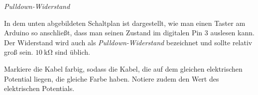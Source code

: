 \begin{aufgabe}\emph{Pulldown-Widerstand}
	
	In dem unten abgebildeten Schaltplan ist dargestellt, wie man einen Taster am Arduino so anschließt, dass man seinen Zustand im digitalen Pin 3 auslesen kann. Der Widerstand wird auch als \emph{Pulldown-Widerstand} bezeichnet und sollte relativ groß sein. $\SI{10}{\kilo\ohm}$ sind üblich.
	
	Markiere die Kabel farbig, sodass die Kabel, die auf dem gleichen elektrischen Potential liegen, die gleiche Farbe haben. Notiere zudem den Wert des elektrischen Potentials.
\end{aufgabe}

